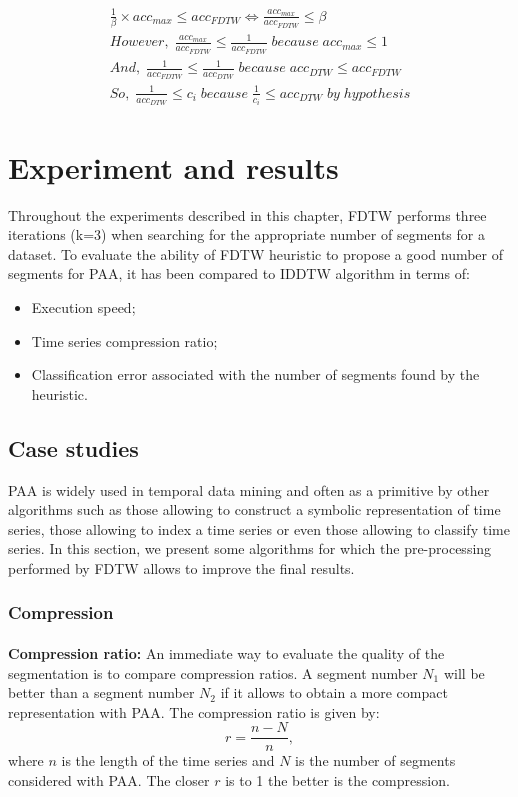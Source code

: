 \begin{eqnarray}
\frac{1}{\beta}\times acc_{max}\leq acc_{FDTW} \Leftrightarrow\frac{acc_{max}}{acc_{FDTW}}\leq \beta \\
However,\; \frac{acc_{max}}{acc_{FDTW}}\leq\frac{1} {acc_{FDTW}}\;because\; acc_{max}\leq 1 \\
And,\; \frac{1}{acc_{FDTW}}\leq\frac{1}{acc_{DTW}} \; because \; acc_{DTW}\leq acc_{FDTW} \\
So,\; \frac{1}{acc_{DTW}}\leq c_{i} \; because \; \frac{1}{c_{i}}\leq acc_{DTW} \; by \; hypothesis
\end{eqnarray}


\section{Experiment and results}
\label{sec:4}
Throughout the experiments described in this chapter, FDTW performs three iterations (k=3) when searching for the appropriate number of segments for a dataset. To evaluate the ability of FDTW heuristic to propose a good number of segments for PAA, it has been compared to IDDTW algorithm in terms of: 

\begin{itemize}
\item Execution speed;
\item Time series compression ratio;
\item Classification error associated with the number of segments found by the heuristic.
\end{itemize}




\subsection{Case studies}

PAA is widely used in temporal data mining and often as a primitive by other algorithms such as
those allowing to construct a symbolic representation of time series, those allowing to index a
time series or even those allowing to classify time series. In this section, we present some
algorithms for which the pre-processing performed by FDTW allows to improve the final
results.
\subsubsection{Compression}

\paragraph{}\textbf{Compression ratio: }
An immediate way to evaluate the quality of the segmentation is to compare  compression ratios. A
segment number $N_1$ will be better than a segment number $N_2$ if it allows to obtain a
more compact representation with PAA. The compression ratio is given by:
\[
r=\frac{n-N}{n},
\]
where $n$ is the length of the time series and $N$ is the number of segments considered with PAA. The closer $r$ is to 1 the better is the compression. 

